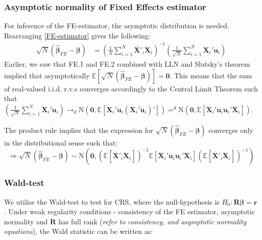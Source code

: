\subsubsection{Asymptotic normality of Fixed Effects estimator}
For inference of the FE-estimator, the asymptotic distribution is needed. Rearranging \eqref{FE-estimator} gives the following:
\begin{align*}
    \sqrt{N}(\pmb{\hat{\beta}}_{FE}-\pmb{\beta})&=  \left( \frac{1}{N} \sum_{i=1}^N {\pmb{\ddot{X'}}_{i} \pmb{\ddot{X}}_{i} } \right) ^{-1} \left( \frac{1}{\sqrt{N}} \sum_{i=1}^N {\pmb{\ddot{X}}_i' \pmb{\ddot{u}}_i} \right)
\end{align*}
Earlier, we saw that FE.1 and FE.2 combined with LLN and Slutsky's theorem implied that asymptotically $\mathbb{E}[\sqrt{N}(\pmb{\hat{\beta}}_{FE}-\pmb{\beta})]=\pmb{0}$. This means that the sum of real-valued i.i.d. r.v.s converges accordingly to the Central Limit Theorem such that $\left( \frac{1}{\sqrt{N}} \sum_{i=1}^N {\pmb{\ddot{X}}_i' \pmb{\ddot{u}}_i} \right)\rightarrow _d \text{N}(\pmb{0},\mathbb{E}[\pmb{\ddot{X}}_i' \pmb{\ddot{u}}_i(\pmb{\ddot{X}}_i' \pmb{\ddot{u}}_i)'])=^d \text{N}(\pmb{0},\mathbb{E}[\pmb{\ddot{X}}_i' \pmb{\ddot{u}}_i\pmb{\ddot{u}}_i'\pmb{\ddot{X}}_i])$.

The product rule implies that the expression for $\sqrt{N}(\pmb{\hat{\beta}}_{FE}-\pmb{\beta})$ converges only in the distributional sense such that:
$$\Rightarrow \sqrt{N}(\pmb{\hat{\beta}}_{FE}-\pmb{\beta}) \sim \text{N} \left(\pmb{0},
(\mathbb{E}[\pmb{\ddot{X'}}_{i} \pmb{\ddot{X}}_{i}])^{-1} \mathbb{E}[\pmb{\ddot{X}}_i' \pmb{\ddot{u}}_i\pmb{\ddot{u}}_i'\pmb{\ddot{X}}_i] (\mathbb{E}[\pmb{\ddot{X'}}_{i} \pmb{\ddot{X}}_{i}])^{-1} \right)$$



\subsubsection*{Wald-test}
We utilise the Wald-test to test for CRS, where the null-hypothesis is $H_0: \mathbf{R}\boldsymbol{\beta}=\mathbf{r}$. Under weak regularity conditions - consistency of the FE estimator, asymptotic normality and $\mathbf{R}$ has full rank (\textit{refer to  consistency, and asymptotic normality equations}), the Wald statistic can be written as:


